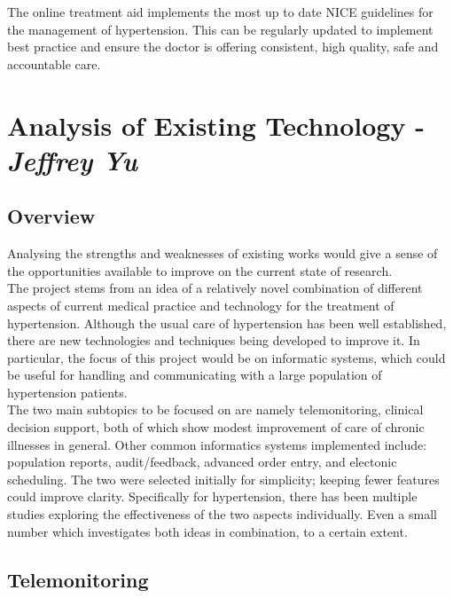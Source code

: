 \documentclass[11pt]{article}
\begin{document}
The online treatment aid implements the most up to date NICE guidelines for the management of hypertension. This can be regularly updated to implement best practice and ensure the doctor is offering consistent, high quality, safe and accountable care.


\section{Analysis of Existing Technology - \textit{Jeffrey Yu}}
\subsection{Overview}
 Analysing the strengths and weaknesses of existing works would give a sense of the opportunities available to improve on the current state of research. 
\\ \indent
The project stems from an idea of a relatively novel combination of different aspects of current medical practice and technology for the treatment of hypertension. Although the usual care of hypertension has been well established, there are new technologies and techniques being developed to improve it.   In particular, the focus of this project would be on informatic systems, which could be useful for handling and communicating with a large population of hypertension patients. 
\\ \indent
 The two main subtopics to be focused on are namely telemonitoring, clinical decision support, both of which show modest improvement of care of chronic illnesses in general\cite{Lit1}. Other common informatics systems implemented include: population reports, audit/feedback, advanced order entry, and electonic scheduling.\cite{Lit1}  The two were selected initially for simplicity; keeping fewer features could improve clarity.  Specifically for hypertension, there has been multiple studies exploring the effectiveness of the two  aspects individually. Even a small number which investigates both ideas in combination, to a certain extent.
\\ \indent
\subsection{Telemonitoring}
\end{document}
